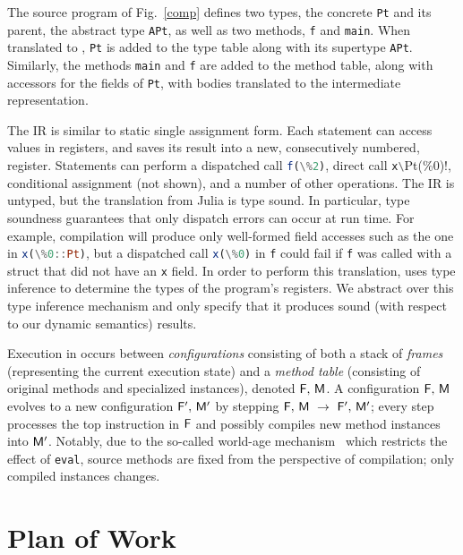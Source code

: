 \documentclass[oneside,openright,titlepage,numbers=noenddot,%
headinclude,footinclude,cleardoublepage=empty,abstract=on,
BCOR=5mm,paper=a4,fontsize=11pt,
dvipsnames
]{scrreprt}
\renewcommand{\c}[1]{\lstinline[language=Julia]!#1!\xspace}
\begin{document}
The source program of Fig.~\ref{comp} defines two types, the concrete \c{Pt} and
its parent, the abstract type \c{APt}, as well as two methods, \c{f} and
\c{main}. When translated to \jules, \c{Pt} is added to the type table along
with its supertype \c{APt}. Similarly, the methods \c{main} and \c{f} are added
to the \jules method table, along with accessors for the fields of \c{Pt}, with
bodies translated to the \jules intermediate representation.

The \jules IR is similar to static single assignment form. Each statement can
access values in registers, and saves its result into a new, consecutively
numbered, register. Statements can perform a dispatched call \c{f(\%2)}, direct
call \c{x\!Pt(\%0)}, conditional assignment (not shown), and a number of other
operations. The IR is untyped, but the translation from Julia is type sound. In
particular, type soundness guarantees that only dispatch errors can occur at run
time. For example, compilation will produce only well-formed field accesses such
as the one in \c{x(\%0::Pt)}, but a dispatched call \c{x(\%0)} in \c{f} could
fail if \c{f} was called with a struct that did not have an \c{x} field. In
order to perform this translation, \jules uses type inference to determine the
types of the program's registers. We abstract over this type inference mechanism
and only specify that it produces sound (with respect to our dynamic semantics)
results. %

Execution in \jules occurs between \emph{configurations} consisting of both
a stack of \emph{frames} \frm (representing the current execution state)
and a \emph{method table} \mtbl (consisting of original methods and specialized
instances), denoted $\mathsf{F},\, \mathsf{M}$. A configuration
$\mathsf{F},\, \mathsf{M}$ evolves to a new configuration
$\mathsf{F}',\, \mathsf{M}'$ by stepping $\mathsf{F},\, \mathsf{M} ~\rightarrow~
\mathsf{F}',\, \mathsf{M}'$; every step processes the top instruction in $\mathsf{F}$
and possibly compiles new method instances into $\mathsf{M}'$. Notably, due to the
so-called world-age mechanism~\cite{oopsla20a} which restricts the effect
of \c{eval}, source methods are fixed from the
perspective of compilation; only compiled instances changes.




\chapter{Plan of Work}%
\label{chap-plan}
\end{document}
